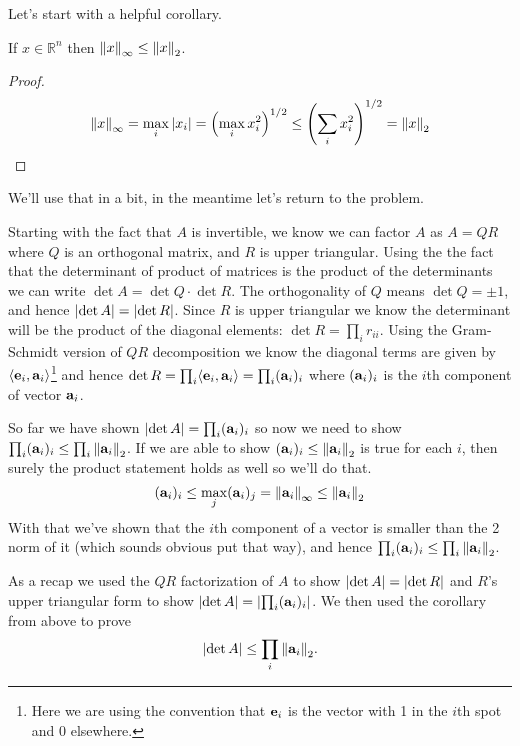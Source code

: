 \documentclass[boxes,pages]{homework}
\begin{document}
\begin{solution}
	Let's start with a helpful corollary.
	\begin{corollary}
		If $x\in\mathbb{R}^n$ then $\norm{x}_\infty \leq \norm{x}_2$.
	\end{corollary}
	\begin{proof}
		\begin{equation*}
			\norm{x}_\infty = \max_i\abs{x_i} = \qty(\max_i{x_i^2})^{1/2} \leq \qty(\sum_ix_i^2)^{1/2} = \norm{x}_2
		\end{equation*}
	\end{proof}
	We'll use that in a bit, in the meantime let's return to the problem.

	Starting with the fact that $A$ is invertible, we know we can factor $A$ as $A = QR$ where $Q$ is an orthogonal matrix, and $R$ is upper triangular. Using the the fact that the determinant of product of matrices is the product of the determinants we can write $\det A = \det Q \cdot \det R$. The orthogonality of $Q$ means $\det Q = \pm 1$, and hence $\abs{\det A} = \abs{\det R}$. Since $R$ is upper triangular we know the determinant will be the product of the diagonal elements: $\det R = \prod_i r_{ii}$. Using the Gram-Schmidt version of $QR$ decomposition we know the diagonal terms are given by $\langle\vb{e}_i, \vb{a}_i\rangle$\footnote{Here we are using the convention that $\vb{e}_i$ is the vector with 1 in the $i$th spot and 0 elsewhere.} and hence $\det R = \prod_i \langle\vb{e}_i, \vb{a}_i\rangle = \prod_i (\vb{a}_i)_i$ where $(\vb{a}_i)_i$ is the $i$th component of vector $\vb{a}_i$.

	So far we have shown $\abs{\det A} = \prod_i(\vb{a}_i)_i$ so now we need to show $\prod_i(\vb{a}_i)_i \leq \prod_i\norm{\vb{a}_i}_2$. If we are able to show $(\vb{a}_i)_i \leq \norm{\vb{a}_i}_2$ is true for each $i$, then surely the product statement holds as well so we'll do that.
	\begin{equation*}
		(\vb{a}_i)_i \leq \max_j(\vb{a}_i)_j = \norm{\vb{a}_i}_\infty \leq \norm{\vb{a}_i}_2
	\end{equation*}
	With that we've shown that the $i$th component of a vector is smaller than the 2 norm of it (which sounds obvious put that way), and hence $\prod_i(\vb{a}_i)_i \leq \prod_i\norm{\vb{a}_i}_2$.

	As a recap we used the $QR$ factorization of $A$ to show $\abs{\det A} = \abs{\det R}$ and $R$'s upper triangular form to show $\abs{\det A} = \abs{\prod_i(\vb{a}_i)_i}$. We then used the corollary from above to prove
	\[
		\abs{\det A} \leq\prod_i\norm{\vb{a}_i}_2.
	\]
\end{solution}
\end{document}
